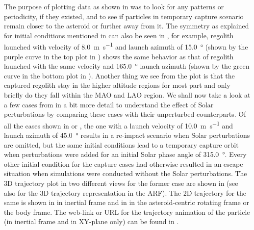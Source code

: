 The purpose of plotting data as shown in  was to look for any patterns or periodicity, if they existed, and to see if particles in temporary capture scenario remain closer to the asteroid or further away from it. The symmetry as explained for initial conditions mentioned in  can also be seen in , for example, regolith launched with velocity of \SI{8.0}{\metre\per\second} and launch azimuth of \SI{15.0}{\degree} (shown by the purple curve in the top plot in ) shows the same behavior as that of regolith launched with the same velocity and \SI{165.0}{\degree} launch azimuth (shown by the green curve in the bottom plot in ). Another thing we see from the plot is that the captured regolith stay in the higher altitude regions for most part and only briefly do they fall within the \gls{MAO} and \gls{LAO} region. We shall now take a look at a few cases from  in a bit more detail to understand the effect of Solar perturbations by comparing these cases with their unperturbed counterparts.
%
\newline\newline
%
Of all the cases shown in  or , the one with a launch velocity of \SI{10.0}{\metre\per\second} and launch azimuth of \SI{45.0}{\degree} results in a re-impact scenario when Solar perturbations are omitted, but the same initial conditions lead to a temporary capture orbit when perturbations were added for an initial Solar phase angle of \SI{315.0}{\degree}. Every other initial condition for the capture cases had otherwise resulted in an escape situation when simulations were conducted without the Solar perturbations. The 3D trajectory plot in two different views for the former case are shown in  (see  also for the 3D trajectory representation in the \gls{ARF}). The 2D trajectory for the same is shown in  in inertial frame and in  in the asteroid-centric rotating frame or the body frame. The web-link or URL for the trajectory animation of the particle (in inertial frame and in XY-plane only) can be found in .
